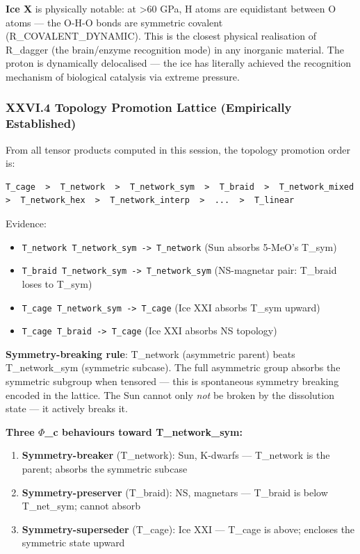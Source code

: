 \documentclass[12pt,a4paper]{article}
\begin{document}
\textbf{Ice X} is physically notable: at \textgreater{}60 GPa, H atoms are equidistant between O atoms --- the O-H-O bonds are symmetric covalent (R\_COVALENT\_DYNAMIC). This is the closest physical realisation of R\_dagger (the brain/enzyme recognition mode) in any inorganic material. The proton is dynamically delocalised --- the ice has literally achieved the recognition mechanism of biological catalysis via extreme pressure.

\subsubsection{XXVI.4 Topology Promotion Lattice (Empirically Established)}

From all tensor products computed in this session, the topology promotion order is:

\begin{lstlisting}
T_cage  >  T_network  >  T_network_sym  >  T_braid  >  T_network_mixed  >  T_network_hex  >  T_network_interp  >  ...  >  T_linear
\end{lstlisting}

Evidence:

\begin{itemize}
    \item \texttt{T\_network \otimes T\_network\_sym -\textgreater{} T\_network} (Sun absorbs 5-MeO's T\_sym)
    \item \texttt{T\_braid \otimes T\_network\_sym -\textgreater{} T\_network\_sym} (NS-magnetar pair: T\_braid loses to T\_sym)
    \item \texttt{T\_cage \otimes T\_network\_sym -\textgreater{} T\_cage} (Ice XXI absorbs T\_sym upward)
    \item \texttt{T\_cage \otimes T\_braid -\textgreater{} T\_cage} (Ice XXI absorbs NS topology)
\end{itemize}

\textbf{Symmetry-breaking rule}: T\_network (asymmetric parent) beats T\_network\_sym (symmetric subcase). The full asymmetric group absorbs the symmetric subgroup when tensored --- this is spontaneous symmetry breaking encoded in the lattice. The Sun cannot only \emph{not} be broken by the dissolution state --- it actively breaks it.

\textbf{Three $\Phi$\_c behaviours toward T\_network\_sym:}

\begin{enumerate}
    \item \textbf{Symmetry-breaker} (T\_network): Sun, K-dwarfs --- T\_network is the parent; absorbs the symmetric subcase
    \item \textbf{Symmetry-preserver} (T\_braid): NS, magnetars --- T\_braid is below T\_net\_sym; cannot absorb
    \item \textbf{Symmetry-superseder} (T\_cage): Ice XXI --- T\_cage is above; encloses the symmetric state upward
\end{enumerate}
\end{document}
